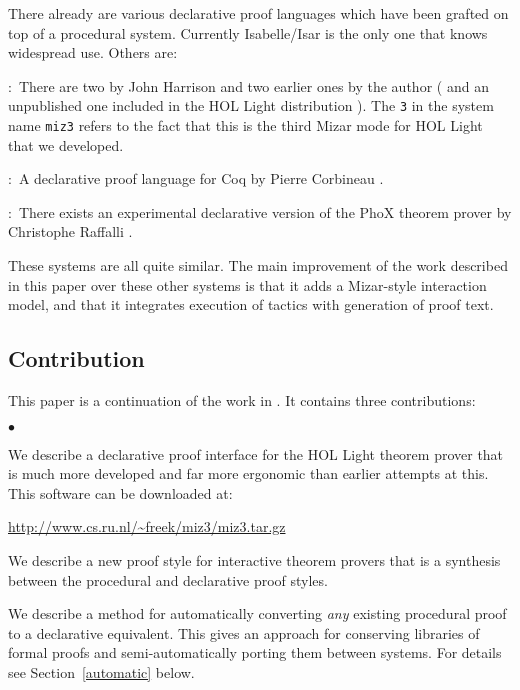 \documentclass{LMCS}
\let\xmedskip=\medskip
\begin{document}
\noindent
There already are various declarative proof languages which have been grafted
on top of a procedural system.
Currently Isabelle/Isar
is the only one that knows widespread use.
Others are:
\begin{desCription}
\item{}:\
There are two by John Harrison \cite{har:96,har:07:1} and two earlier ones by the author (\cite{wie:01} and an unpublished
one included in the HOL Light distribution \cite{har:xx}).
The \texttt{3} in the system name \texttt{miz3} refers to the fact that this is the third Mizar mode for HOL Light that we developed.
\medskip

\item{}:\ 
A declarative proof language for Coq by Pierre Corbineau \cite{cor:07}.
\medskip

\item{}:\
There exists an experimental declarative version of the PhoX theorem prover by Christophe Raffalli \cite{pho:xx}.

\end{desCription}

\noindent
These systems are all quite similar.
The main improvement of the work described in this paper over these
other systems is that it adds a Mizar-style interaction model,
and that it integrates execution of tactics with generation of proof text.

\subsection{Contribution}

\noindent
This paper is a continuation of the work in \cite{kal:wie:09,wie:01}.
It contains three contributions:
\begin{iteMize}{$\bullet$}
\item
We describe a declarative proof interface for the HOL Light
theorem prover that is much more developed and far more ergonomic
than earlier attempts at this.
This software can be downloaded at:
\xmedskip
\begin{center}
\url{http://www.cs.ru.nl/~freek/miz3/miz3.tar.gz}
\end{center}
\xmedskip

\item
We describe a new proof style for interactive theorem provers
that is a synthesis between the
procedural and declarative proof styles.

\item
We describe a method for automatically converting \emph{any}
existing procedural proof to a declarative equivalent.
This gives an approach for conserving
libraries of formal proofs and semi-automatically porting them between
systems.
For details see Section~\ref{automatic} below.

\end{iteMize}
\end{document}
